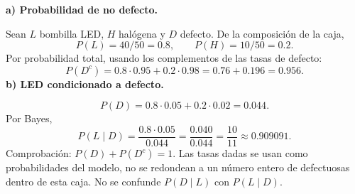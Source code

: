 \textbf{a) Probabilidad de no defecto.}\par\nopagebreak[4]
Sean $L$ bombilla LED, $H$ halógena y $D$ defecto. De la composición de la caja,
\[
P(L)=40/50=0.8,\qquad P(H)=10/50=0.2.
\]
Por probabilidad total, usando los complementos de las tasas de defecto:
\[
\boxed{P(D^c)=0.8\cdot0.95+0.2\cdot0.98=0.76+0.196=0.956.}
\]
\textbf{b) LED condicionado a defecto.}\par\nopagebreak[4]
\[
P(D)=0.8\cdot0.05+0.2\cdot0.02=0.044.
\]
Por Bayes,
\[
\boxed{P(L\mid D)=\frac{0.8\cdot0.05}{0.044}
=\frac{0.040}{0.044}=\frac{10}{11}\approx0.909091.}
\]
Comprobación: $P(D)+P(D^c)=1$. Las tasas dadas se usan como probabilidades del modelo, no se redondean a un número entero de defectuosas dentro de esta caja. No se confunde $P(D\mid L)$ con $P(L\mid D)$.
